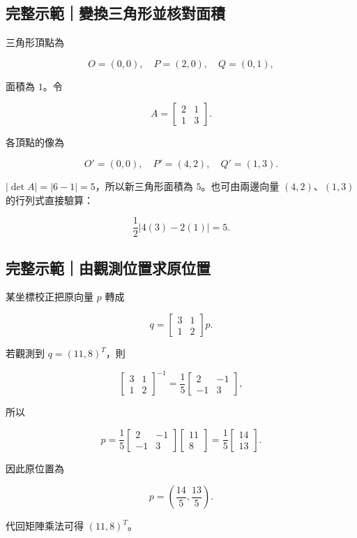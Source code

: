 \documentclass[11pt,a4paper]{article}
\begin{document}
\begin{HandoutWorkedExample}

\subsection{完整示範｜變換三角形並核對面積}\label{ux5b8cux6574ux793aux7bc4ux8b8aux63dbux4e09ux89d2ux5f62ux4e26ux6838ux5c0dux9762ux7a4d}

三角形頂點為

\[
O=(0,0),\quad P=(2,0),\quad Q=(0,1),
\]

面積為 \(1\)。令

\[
A=\begin{bmatrix}2&1\\1&3\end{bmatrix}.
\]

各頂點的像為

\[
O'=(0,0),\quad P'=(4,2),\quad Q'=(1,3).
\]

\(|\det A|=|6-1|=5\)，所以新三角形面積為 \(\boxed{5}\)。也可由兩邊向量 \((4,2)\)、\((1,3)\) 的行列式直接驗算：

\[
\frac12|4(3)-2(1)|=5.
\]

\end{HandoutWorkedExample}

\begin{HandoutWorkedExample}

\subsection{完整示範｜由觀測位置求原位置}\label{ux5b8cux6574ux793aux7bc4ux7531ux89c0ux6e2cux4f4dux7f6eux6c42ux539fux4f4dux7f6e}

某坐標校正把原向量 \(p\) 轉成

\[
q=
\begin{bmatrix}3&1\\1&2\end{bmatrix}p.
\]

若觀測到 \(q=(11,8)^T\)，則

\[
\begin{bmatrix}3&1\\1&2\end{bmatrix}^{-1}
=\frac15\begin{bmatrix}2&-1\\-1&3\end{bmatrix},
\]

所以

\[
p=\frac15
\begin{bmatrix}2&-1\\-1&3\end{bmatrix}
\begin{bmatrix}11\\8\end{bmatrix}
=\frac15\begin{bmatrix}14\\13\end{bmatrix}.
\]

因此原位置為

\[
\boxed{p=\left(\frac{14}{5},\frac{13}{5}\right)}.
\]

代回矩陣乘法可得 \((11,8)^T\)。

\end{HandoutWorkedExample}
\end{document}
